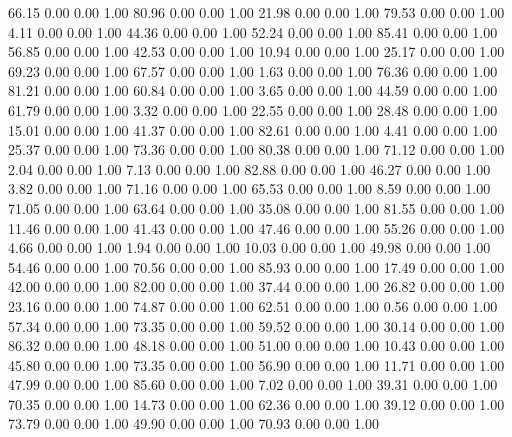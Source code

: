    66.15   0.00   0.00   1.00
   80.96   0.00   0.00   1.00
   21.98   0.00   0.00   1.00
   79.53   0.00   0.00   1.00
    4.11   0.00   0.00   1.00
   44.36   0.00   0.00   1.00
   52.24   0.00   0.00   1.00
   85.41   0.00   0.00   1.00
   56.85   0.00   0.00   1.00
   42.53   0.00   0.00   1.00
   10.94   0.00   0.00   1.00
   25.17   0.00   0.00   1.00
   69.23   0.00   0.00   1.00
   67.57   0.00   0.00   1.00
    1.63   0.00   0.00   1.00
   76.36   0.00   0.00   1.00
   81.21   0.00   0.00   1.00
   60.84   0.00   0.00   1.00
    3.65   0.00   0.00   1.00
   44.59   0.00   0.00   1.00
   61.79   0.00   0.00   1.00
    3.32   0.00   0.00   1.00
   22.55   0.00   0.00   1.00
   28.48   0.00   0.00   1.00
   15.01   0.00   0.00   1.00
   41.37   0.00   0.00   1.00
   82.61   0.00   0.00   1.00
    4.41   0.00   0.00   1.00
   25.37   0.00   0.00   1.00
   73.36   0.00   0.00   1.00
   80.38   0.00   0.00   1.00
   71.12   0.00   0.00   1.00
    2.04   0.00   0.00   1.00
    7.13   0.00   0.00   1.00
   82.88   0.00   0.00   1.00
   46.27   0.00   0.00   1.00
    3.82   0.00   0.00   1.00
   71.16   0.00   0.00   1.00
   65.53   0.00   0.00   1.00
    8.59   0.00   0.00   1.00
   71.05   0.00   0.00   1.00
   63.64   0.00   0.00   1.00
   35.08   0.00   0.00   1.00
   81.55   0.00   0.00   1.00
   11.46   0.00   0.00   1.00
   41.43   0.00   0.00   1.00
   47.46   0.00   0.00   1.00
   55.26   0.00   0.00   1.00
    4.66   0.00   0.00   1.00
    1.94   0.00   0.00   1.00
   10.03   0.00   0.00   1.00
   49.98   0.00   0.00   1.00
   54.46   0.00   0.00   1.00
   70.56   0.00   0.00   1.00
   85.93   0.00   0.00   1.00
   17.49   0.00   0.00   1.00
   42.00   0.00   0.00   1.00
   82.00   0.00   0.00   1.00
   37.44   0.00   0.00   1.00
   26.82   0.00   0.00   1.00
   23.16   0.00   0.00   1.00
   74.87   0.00   0.00   1.00
   62.51   0.00   0.00   1.00
    0.56   0.00   0.00   1.00
   57.34   0.00   0.00   1.00
   73.35   0.00   0.00   1.00
   59.52   0.00   0.00   1.00
   30.14   0.00   0.00   1.00
   86.32   0.00   0.00   1.00
   48.18   0.00   0.00   1.00
   51.00   0.00   0.00   1.00
   10.43   0.00   0.00   1.00
   45.80   0.00   0.00   1.00
   73.35   0.00   0.00   1.00
   56.90   0.00   0.00   1.00
   11.71   0.00   0.00   1.00
   47.99   0.00   0.00   1.00
   85.60   0.00   0.00   1.00
    7.02   0.00   0.00   1.00
   39.31   0.00   0.00   1.00
   70.35   0.00   0.00   1.00
   14.73   0.00   0.00   1.00
   62.36   0.00   0.00   1.00
   39.12   0.00   0.00   1.00
   73.79   0.00   0.00   1.00
   49.90   0.00   0.00   1.00
   70.93   0.00   0.00   1.00
